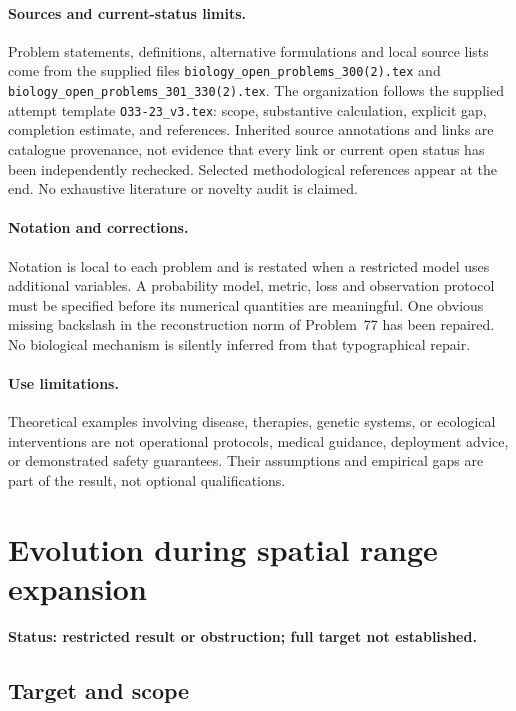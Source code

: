 \documentclass[11pt]{article}
\begin{document}
\paragraph{Sources and current-status limits.}
Problem statements, definitions, alternative formulations and local source lists
come from the supplied files
\texttt{biology\_open\_problems\_300(2).tex} and
\texttt{biology\_open\_problems\_301\_330(2).tex}.
The organization follows the supplied attempt template
\texttt{O33-23\_v3.tex}: scope, substantive calculation, explicit gap,
completion estimate, and references. Inherited source annotations and links are
catalogue provenance, not evidence that every link or current open status has
been independently rechecked. Selected methodological references appear at the
end. No exhaustive literature or novelty audit is claimed.

\paragraph{Notation and corrections.}
Notation is local to each problem and is restated when a restricted model uses
additional variables. A probability model, metric, loss and observation protocol
must be specified before its numerical quantities are meaningful. One obvious
missing backslash in the reconstruction norm of Problem~77 has been repaired.
No biological mechanism is silently inferred from that typographical repair.

\paragraph{Use limitations.}
Theoretical examples involving disease, therapies, genetic systems, or ecological
interventions are not operational protocols, medical guidance, deployment advice,
or demonstrated safety guarantees. Their assumptions and empirical gaps are part
of the result, not optional qualifications.


\section*{Evolution during spatial range expansion}
\label{prob:175}
\noindent\textbf{Status: restricted result or obstruction; full target not established.}
\subsection{Target and scope}
\end{document}
